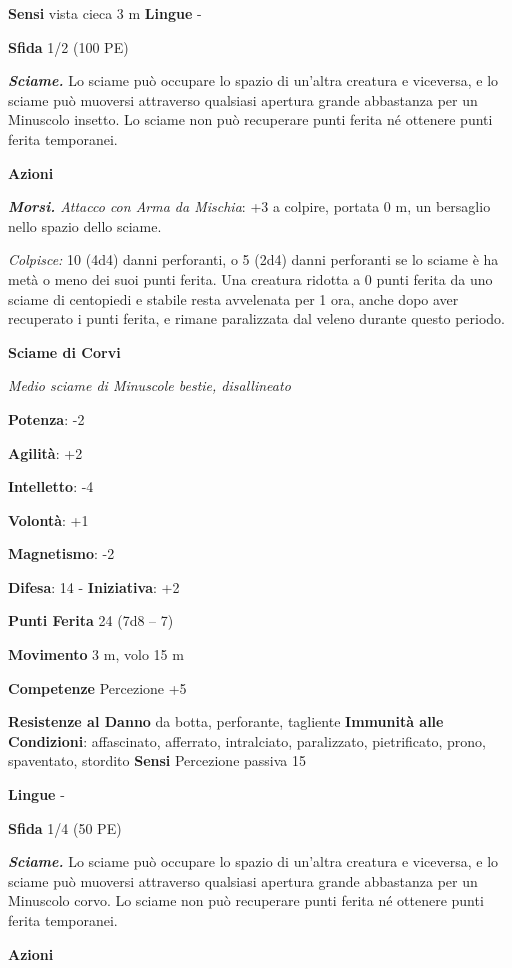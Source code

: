 \begin{multicols}{2}
\textbf{Sensi} vista cieca 3 m \textbf{Lingue} -

\textbf{Sfida} 1/2 (100 PE)\smallskip

\emph{\textbf{Sciame.}} Lo sciame può occupare lo spazio di un'altra
creatura e viceversa, e lo sciame può muoversi attraverso qualsiasi
apertura grande abbastanza per un Minuscolo insetto. Lo sciame non può
recuperare punti ferita né ottenere punti ferita temporanei.

\smallskip\textbf{Azioni}

\emph{\textbf{Morsi.} Attacco con Arma da Mischia}: +3 a colpire,
portata 0 m, un bersaglio nello spazio dello sciame.

\emph{Colpisce:} 10 (4d4) danni perforanti, o 5 (2d4) danni perforanti
se lo sciame è ha metà o meno dei suoi punti ferita. Una creatura
ridotta a 0 punti ferita da uno sciame di centopiedi e stabile resta
avvelenata per 1 ora, anche dopo aver recuperato i punti ferita, e
rimane paralizzata dal veleno durante questo periodo.

\textbf{Sciame di Corvi}

\emph{Medio sciame di Minuscole bestie, disallineato}

\textbf{Potenza}: -2

\textbf{Agilità}: +2

\textbf{Intelletto}: -4

\textbf{Volontà}: +1

\textbf{Magnetismo}: -2

\textbf{Difesa}: 14 - \textbf{Iniziativa}: +2

\textbf{Punti Ferita} 24 (7d8 -- 7)

\textbf{Movimento} 3 m, volo 15 m

\textbf{Competenze} Percezione +5

\textbf{Resistenze al Danno} da botta, perforante, tagliente
\textbf{Immunità alle Condizioni}: affascinato, afferrato, intralciato,
paralizzato, pietrificato, prono, spaventato, stordito \textbf{Sensi}
Percezione passiva 15

\textbf{Lingue} -

\textbf{Sfida} 1/4 (50 PE)\smallskip

\emph{\textbf{Sciame.}} Lo sciame può occupare lo spazio di un'altra
creatura e viceversa, e lo sciame può muoversi attraverso qualsiasi
apertura grande abbastanza per un Minuscolo corvo. Lo sciame non può
recuperare punti ferita né ottenere punti ferita temporanei.

\smallskip\textbf{Azioni}


\end{multicols}
